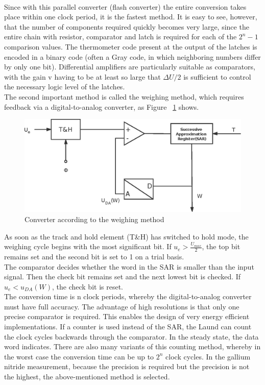 \\
Since with this parallel converter (flash converter) the entire conversion takes place within one clock period, it is the fastest method. It is easy to see, however, that the number of components required quickly becomes very large, since the entire chain with resistor, comparator and latch is required for each of the $2^{n}-1$ comparison values. The thermometer code present at the output of the latches is encoded in a binary code (often a Gray code, in which neighboring numbers differ by only one bit). Differential amplifiers are particularly suitable as comparators, with the gain v having to be at least so large that $\Delta U/2$ is sufficient to control the necessary logic level of the latches.
\\
The second important method is called the weighing method, which requires feedback via a digital-to-analog converter, as Figure ~\ref{fig:2.4} shows.
\begin{figure}[h]
	\centering
	\includegraphics{grafiken/2.4.eps}
	\caption{Converter according to the weighing method} 
	\label{fig:2.4}
\end{figure}
 As soon as the track and hold element (T\&H) has switched to hold mode, the weighing cycle begins with the most significant bit. If $ u_{e}>\frac{U_{max}}{2} $, the top bit remains set and the second bit is set to 1 on a trial basis.
\\
The comparator decides whether the word in the SAR is smaller than the input signal. Then the check bit remains set and the next lowest bit is checked. If  $u_{e}<u_{DA}(W)$, the check bit is reset.
\\
The conversion time is n clock periods, whereby the digital-to-analog converter must have full accuracy. The advantage of high resolutions is that only one precise comparator is required. This enables the design of very energy efficient implementations.
If a counter is used instead of the SAR, the Laund can count the clock cycles backwards through the comparator. In the steady state, the data word indicates. There are also many variants of this counting method, whereby in the worst case the conversion time can be up to $2^{n}$ clock cycles.
In the gallium nitride measurement, because the precision is required but the precision is not the highest, the above-mentioned method is selected.

